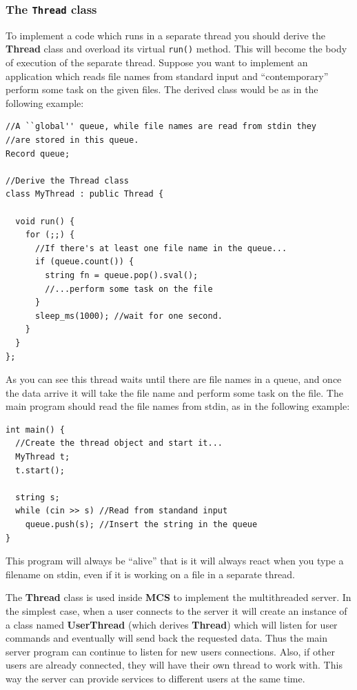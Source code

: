 \documentclass[12pt,titlepage]{article}
\newcommand{\mcs}{\textbf{MCS} }
\begin{document}
\subsubsection{The \texttt{Thread} class}
\label{sec:The Thread class}
To implement a code which runs in a separate thread you should derive
the \textbf{Thread} class and overload its virtual \verb|run()|
method. This will become the body of execution of the separate thread.
Suppose you want to implement an application which reads file names
from standard input and ``contemporary'' perform some task on the
given files. The derived class would be as in the following example:

\begin{lstlisting}
//A ``global'' queue, while file names are read from stdin they
//are stored in this queue.
Record queue;

//Derive the Thread class
class MyThread : public Thread {

  void run() {
    for (;;) {
      //If there's at least one file name in the queue...
      if (queue.count()) {
        string fn = queue.pop().sval();
        //...perform some task on the file
      }
      sleep_ms(1000); //wait for one second.
    }
  }
};
\end{lstlisting}

\noindent
As you can see this thread waits until there are file names in a queue,
and once the data arrive it will take the file name and perform some
task on the file. The main program should read the file names from
stdin, as in the following example:

\begin{lstlisting}
int main() {
  //Create the thread object and start it...
  MyThread t;
  t.start();

  string s;
  while (cin >> s) //Read from standand input
    queue.push(s); //Insert the string in the queue
}
\end{lstlisting}

\noindent
This program will always be ``alive'' that is it will always react
when you type a filename on stdin, even if it is working on a file in
a separate thread.

\bigskip
The \textbf{Thread} class is used inside \mcs to implement the multithreaded
server. In the simplest case, when a user connects to the server it will
create an instance of a class named \textbf{UserThread} (which derives
\textbf{Thread}) which will listen for user commands and eventually will send
back the requested data.  Thus the main server program can continue to listen
for new users connections. Also, if other users are already connected, they
will have their own thread to work with.  This way the server can provide
services to different users at the same time.
\end{document}
